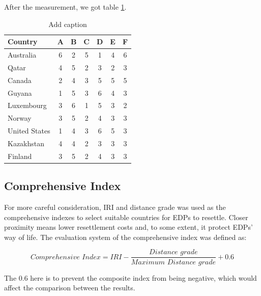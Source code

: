 \documentclass[12pt]{article}  %
\begin{document}
After the measurement, we got table \ref{distance}.



\begin{table}[htbp]
  \centering
  \caption{Add caption}
    \begin{tabular}{lcccccc}
    \toprule
    Country & A     & B     & C     & D     & E     & F \\
    \midrule
    Australia & 6     & 2     & 5     & 1     & 4     & 6 \\
    Qatar & 4     & 5     & 2     & 3     & 2     & 3 \\
    Canada & 2     & 4     & 3     & 5     & 5     & 5 \\
    Guyana & 1     & 5     & 3     & 6     & 4     & 3 \\
    Luxembourg & 3     & 6     & 1     & 5     & 3     & 2 \\
    Norway & 3     & 5     & 2     & 4     & 3     & 3 \\
    United States & 1     & 4     & 3     & 6     & 5     & 3 \\
    Kazakhstan & 4     & 4     & 2     & 3     & 3     & 3 \\
    Finland & 3     & 5     & 2     & 4     & 3     & 3 \\
    \bottomrule
    \end{tabular}%
  \label{distance}%
\end{table}%





\subsection{Comprehensive Index}
For more careful consideration, IRI and distance grade was used as the comprehensive indexes to select suitable countries for EDPs to resettle. Closer proximity means lower resettlement costs and, to some extent, it protect EDPs' way of life. The evaluation system of the comprehensive index was defined as:

\begin{equation}
    Comprehensive\,\,Index=IRI-\frac{Distance\,\,grade}{Maximum\,\,Distance\,\,grade}+0.6
\end{equation}


The 0.6 here is to prevent the composite index from being negative, which would affect the comparison between the results.
\end{document}
